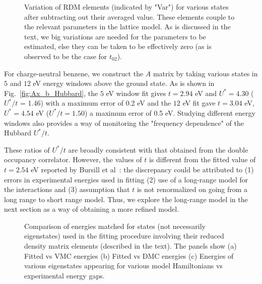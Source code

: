 \documentclass[aip,jcp,twocolumn,10pt]{revtex4-1}
\begin{document}
\begin{figure*}[htpb]
\centering
{}
\caption{Variation of RDM elements (indicated by "Var") for various states 
after subtracting out their averaged value. These elements couple to the relevant parameters 
in the lattice model. As is discussed in the text, we big variations are needed 
for the parameters to be estimated, else they can be taken to be effectively zero 
(as is observed to be the case for $t_{02}$).}
\label{fig:variations}
\end{figure*}	

For charge-neutral benzene, we construct the $A$ matrix 
by taking various states in $5$ and $12$ eV energy windows above the ground state. 
As is shown in Fig.~\ref{fig:Ax_b_Hubbard}, the $5$ eV window fit 
gives $t=2.94$ eV and $U^{*}=4.30$ ($U^{*}/t$ = 1.46) with a maximum error of 
0.2 eV and the $12$ eV fit gave $t=3.04$ eV, $U^{*}=4.54$ eV ($U^{*}/t = 1.50$) 
a maximum error of 0.5 eV. 
Studying different energy windows also provides a way of monitoring 
the "frequency dependence" of the Hubbard $U^{*}/t$. 

These ratios of $U^{*}/t$ are broadly consistent 
with that obtained from the double occupancy correlator. However, the 
values of $t$ is different from the fitted value of $t=2.54 $ eV reported by 
Bursill et al~\cite{Bursill}: the discrepancy could be attributed to 
(1) errors in experimental energies used in fitting 
(2) use of a long-range model for the interactions 
and (3) assumption that $t$ is not renormalized 
on going from a long range to short range model. 
Thus, we explore the long-range model in the next section 
as a way of obtaining a more refined model.

\begin{figure*}[htpb]
\centering
{}
\caption{Comparison of energies matched 
for states (not necessarily eigenstates) used in the fitting procedure 
involving their reduced density matrix elements (described in the text). 
The panels show (a) Fitted vs VMC energies (b) Fitted vs DMC energies (c) 
Energies of various eigenstates appearing for various model Hamiltonians 
vs experimental energy gaps.}
\label{fig:expt} 
\end{figure*}	
\end{document}

